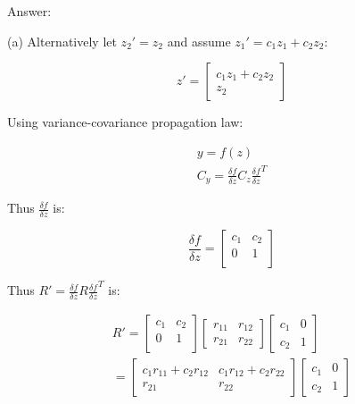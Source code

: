 \documentclass[letterpaper,11pt]{article}
\begin{document}
Answer:

(a) Alternatively let $z_2' = z_2$ and assume $z_1' = c_1 z_1 + c_2 z_2$:

\begin{equation}
z'= \left[ 
\begin{array}{c}
c_1 z_1 + c_2 z_2  \\
z_2 
\end{array}
\right]
\end{equation}

Using variance-covariance propagation law:

\begin{equation}
\begin{array}{c}
y=f(z) \\
C_y = \frac{\delta f}{\delta z} C_z \frac{\delta f}{\delta z}^T
\end{array}
\end{equation}

Thus $\frac{\delta f}{\delta z}$ is:

\begin{equation}
\frac{\delta f}{\delta z} = \left[ 
\begin{array}{cc}
c_1 & c_2 \\
0 & 1 \\
\end{array}
\right]
\end{equation}

Thus $R'= \frac{\delta f}{\delta z} R \frac{\delta f}{\delta z}^T$ is:

\begin{equation}
\begin{array}{c}
R' = 
\left[ 
\begin{array}{cc}
c_1 & c_2 \\
0 & 1 \\
\end{array}
\right]
\left[ 
\begin{array}{cc}
r_{11} & r_{12} \\
r_{21} & r_{22}
\end{array}
\right]
\left[ 
\begin{array}{cc}
c_1 & 0\\
c_2 & 1
\end{array}
\right] \\
= 
\left[ 
\begin{array}{cc}
c_1 r_{11} + c_2 r_{12} & c_1 r_{12} + c_2 r_{22} \\
r_{21} & r_{22}
\end{array}
\right]
\left[
\begin{array}{cc}
c_1 & 0\\
c_2 & 1
\end{array}
\right]
\end{array}
\end{equation}
\end{document}
